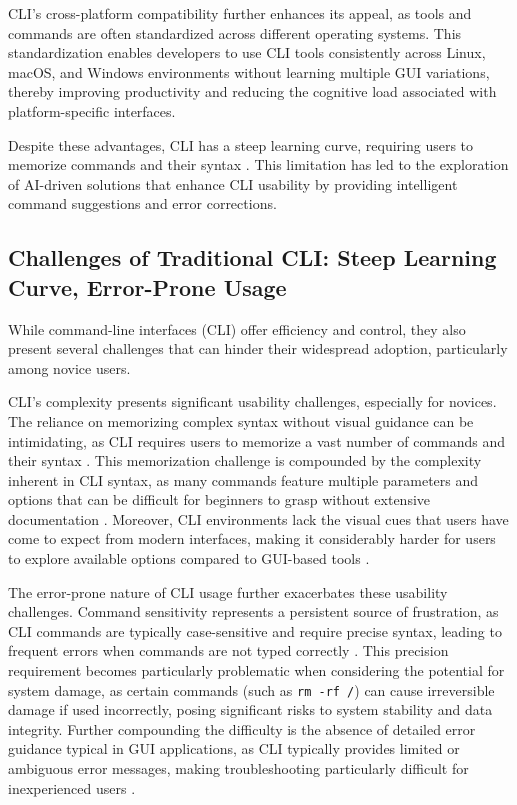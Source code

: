 CLI's cross-platform compatibility further enhances its appeal, as tools and commands are often standardized across different operating systems. This standardization enables developers to use CLI tools consistently across Linux, macOS, and Windows environments without learning multiple GUI variations, thereby improving productivity and reducing the cognitive load associated with platform-specific interfaces.

Despite these advantages, CLI has a steep learning curve, requiring users to memorize commands and their syntax \cite{margono1987}. This limitation has led to the exploration of AI-driven solutions that enhance CLI usability by providing intelligent command suggestions and error corrections.

\subsection{Challenges of Traditional CLI: Steep Learning Curve, Error-Prone Usage}

While command-line interfaces (CLI) offer efficiency and control, they also present several challenges that can hinder their widespread adoption, particularly among novice users.

CLI's complexity presents significant usability challenges, especially for novices. The reliance on memorizing complex syntax without visual guidance can be intimidating, as CLI requires users to memorize a vast number of commands and their syntax \cite{margono1987}. This memorization challenge is compounded by the complexity inherent in CLI syntax, as many commands feature multiple parameters and options that can be difficult for beginners to grasp without extensive documentation \cite{margono1987}. Moreover, CLI environments lack the visual cues that users have come to expect from modern interfaces, making it considerably harder for users to explore available options compared to GUI-based tools \cite{card1983}.

The error-prone nature of CLI usage further exacerbates these usability challenges. Command sensitivity represents a persistent source of frustration, as CLI commands are typically case-sensitive and require precise syntax, leading to frequent errors when commands are not typed correctly \cite{margono1987}. This precision requirement becomes particularly problematic when considering the potential for system damage, as certain commands (such as \texttt{rm -rf /}) can cause irreversible damage if used incorrectly, posing significant risks to system stability and data integrity. Further compounding the difficulty is the absence of detailed error guidance typical in GUI applications, as CLI typically provides limited or ambiguous error messages, making troubleshooting particularly difficult for inexperienced users \cite{margono1987}.

